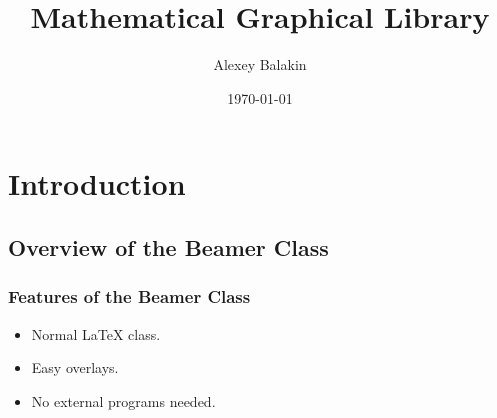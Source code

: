 \documentclass{beamer}
\title{Mathematical Graphical Library}
\author{Alexey Balakin}
\date{\today}
\begin{document}
\frame{\titlepage}

\section[Outline]{}
\frame{\tableofcontents}

\section{Introduction}
\subsection{Overview of the Beamer Class}
\frame
{
  \frametitle{Features of the Beamer Class}

  \begin{itemize}
  \item<1-> Normal LaTeX class.
  \item<2-> Easy overlays.
  \item<3-> No external programs needed.      
  \end{itemize}
}
\end{document}

